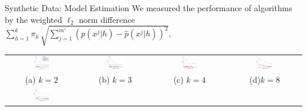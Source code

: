 \documentclass[final,t]{beamer}
\begin{document}
\begin{frame}{}
\begin{columns}[t]
\begin{column}{0.3\linewidth}
    \begin{block}{Synthetic Data: Model Estimation}
      \vspace{0.1in}
      We measured the performance of algorithms by the weighted $\ell_2$ norm difference
      $
      \sum_{h=1}^{k} \pi_h\, \sqrt{\sum_{j=1}^{m'} (p(x^j|h) - \widehat{p}(x^j|h))^2 },
      $
      \begin{center}
        \begin{tabular}{cccc}
          \includegraphics[width=0.23\textwidth]{../experiment/figure_new/sp_diff_gauss_k_2_view_2-crop} &
          \includegraphics[width=0.23\textwidth]{../experiment/figure_new/sp_diff_gauss_k_3_view_3-crop} &
          \includegraphics[width=0.23\textwidth]{../experiment/figure_new/sp_diff_gauss_k_4_view_1-crop} &
          \includegraphics[width=0.23\textwidth]{../experiment/figure_new/sp_diff_gauss_k_8_view_1-crop} \\[-1mm]
          (a) $k=2$ & (b) $k=3$ & (c) $k=4$ & (d)$k=8$ \\[-1mm]
          \includegraphics[width=0.23\textwidth]{../experiment/figure_new/sp_diff_heter_k_2_view_2-crop} &

\end{tabular}
\end{center}
\end{block}
\end{column}
\end{columns}
\end{frame}
\end{document}
